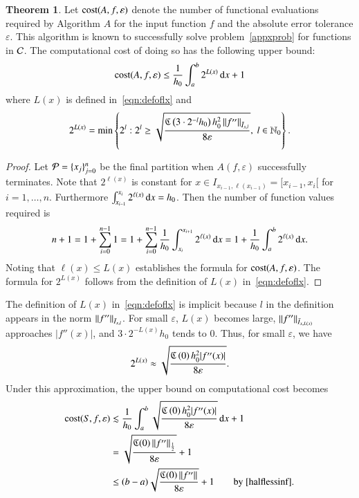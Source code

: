 \documentclass[review]{elsarticle}
\newcommand{\abstol}{\varepsilon}
\theoremstyle{definition}
\newtheorem{theorem}{Theorem}
\begin{document}
\begin{theorem}\label{thm:cost}
Let $\cost(A,f,\abstol)$ denote the number of functional evaluations required by Algorithm $A$ for the input function $f$ and the absolute error tolerance $\abstol$.  This algorithm is known to successfully solve problem~\eqref{appxprob} for functions in $\cc$.  The computational cost of doing so has the following upper bound:
\begin{equation*}
\cost(A,f,\abstol) \le \frac{1}{h_0}\int_a^b 2^{L(x)} \, \dif x +1 \\
\end{equation*}
where $L(x)$ is defined in~\eqref{eqn:defoflx} and
\begin{equation*}
2^{L(x)} = \min\left\{2^l:  2^l \ge \sqrt{\frac{\fC\left(3\cdot 2^{-l} h_0\right) h_0^2 \norm[\bar{I}_{x,l}]{f''} }{8 \abstol}}, \  l \in  \natzero\right\}.
\end{equation*}
\end{theorem}

\begin{proof}
Let $\cp=\{x_j\}_{j=0}^n$ be the final partition when $A(f,\abstol)$ successfully terminates. Note that $2^{\ell(x)}$ is constant for  $x \in I_{x_{i-1},\ell(x_{i-1})} = [x_{i-1},x_{i}[$ for $i=1, \ldots, n$.  Furthermore  $\int_{x_{i-1}}^{x_{i}} 2^{\ell(x)} \, \dif  x =  h_0$.  Then the number of function values required is
\begin{equation*}
n+1 = 1 + \sum_{i=0}^{n-1} 1 = 1 + \sum_{i=0}^{n-1} \frac{1}{h_0} \int_{x_i}^{x_{i+1}} 2^{\ell(x)} \, \dif  x = 1 + \frac{1}{h_0}\int_a^b 2^{\ell(x)} \, \dif x.
\end{equation*}
Noting that $\ell(x) \le L(x)$ establishes the formula for $\cost(A,f,\abstol)$.  The formula for $2^{L(x)}$ follows from the definition of $L(x)$
in~\eqref{eqn:defoflx}.
\end{proof}

The definition of $L(x)$ in~\eqref{eqn:defoflx} is implicit because $l$ in the definition appears in the norm $\norm[\bar{I}_{x,l}]{f''}$.  For small $\abstol$, $L(x)$ becomes large,  $\norm[\bar{I}_{x,L(x)}]{f''}$ approaches $|f''(x)|$, and $3\cdot 2^{-L(x)}h_0$ tends to $0$.  Thus, for small $\abstol$, we have
\begin{equation} \label{twoLxapprox}
 2^{L(x)} \approx \sqrt{\frac{\fC\left(0\right)  h_0^2 |f''(x)|}{8\abstol}}.
 \end{equation}
Under this approximation, the upper bound on computational cost becomes
\begin{align}
\nonumber
\cost(S,f,\abstol)  &\lesssim \frac{1}{h_0}\int_a^b \sqrt{\frac{\fC\left(0\right)  h_0^2 |f''(x)|}{8\abstol}} \, \dif x +1 \\
& =\sqrt{\frac{\fC(0) \norm[\frac 12]{f''}}{8\abstol}} +1 \label{costbdapprox} \\
& \le (b-a)\sqrt{\frac{\fC(0) \norm{f''}}{8\abstol}} +1 \label{costbdinf}  \qquad \text{by \eqref{halflessinf}}.
\end{align}
\end{document}
